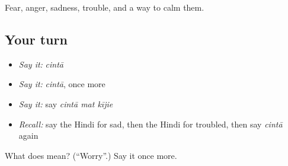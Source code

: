 \begin{grammarlens}[title={What you've built}]
Fear, anger, sadness, trouble, and a way to calm them.
\end{grammarlens}

\subsection*{Your turn}
\begin{itemize}
\raggedright
  \item \emph{Say it:} \emph{cintā}
  \item \emph{Say it:} \emph{cintā}, once more
  \item \emph{Say it:} say \emph{cintā mat kījie}
  \item \emph{Recall:} say the Hindi for sad, then the Hindi for troubled, then say \emph{cintā} again
\end{itemize}

\begin{tcolorbox}[breakable,colback=teal!4,colframe=teal!35!black,title={Before you move on}]
What does  mean? (\textquotedblleft{}Worry\textquotedblright{}.) Say it once more.
\end{tcolorbox}
